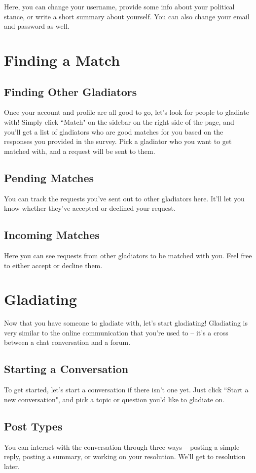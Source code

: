 \documentclass[12pt]{article}
\begin{document}
Here, you can change your username, provide some info about your political
stance, or write a short summary about yourself. You can also change your email
and password as well.

\section{Finding a Match}

\subsection{Finding Other Gladiators}
Once your account and profile are all good to go, let's look for people to
gladiate with! Simply click “Match" on the sidebar on the right side of the
page, and you'll get a list of gladiators who are good matches for you based on
the responses you provided in the survey. Pick a gladiator who you want to get
matched with, and a request will be sent to them.

\subsection{Pending Matches}
You can track the requests you've sent out to other gladiators here. It'll let
you know whether they've accepted or declined your request.

\subsection{Incoming Matches}
Here you can see requests from other gladiators to be matched with you. Feel
free to either accept or decline them.

\section{Gladiating}
Now that you have someone to gladiate with, let's start gladiating! Gladiating
is very similar to the online communication that you're used to -- it's a cross
between a chat conversation and a forum.

\subsection{Starting a Conversation}
To get started, let's start a conversation if there isn't one yet. Just click
``Start a new conversation", and pick a topic or question you'd like to gladiate
on.

\subsection{Post Types}
You can interact with the conversation through three ways -- posting a simple
reply, posting a summary, or working on your resolution. We'll get to resolution
later.
\end{document}
